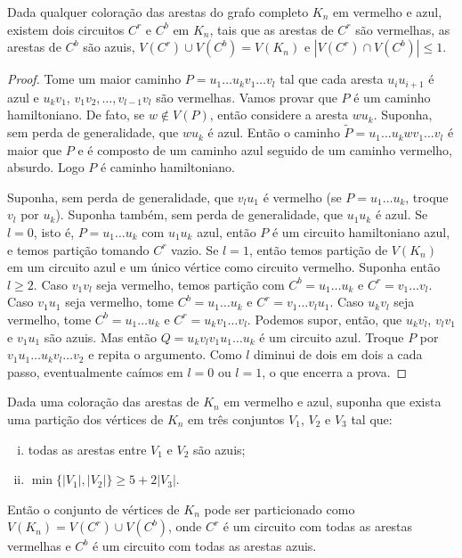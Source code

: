 \begin{lema}
	\label{lema:gyarfas}
	Dada qualquer coloração das arestas do grafo completo $K_n$ em vermelho e azul, existem dois circuitos $C^r$ e $C^b$ em $K_n$, tais que as arestas de $C^r$ são vermelhas, as arestas de $C^b$ são azuis, $V(C^r)\cup V(C^b) = V(K_n)$ e $|V(C^r)\cap V(C^b)|\leq1$.
\end{lema}

\begin{proof}
	Tome um maior caminho $P = u_1\dots u_kv_1\dots v_l$ tal que cada aresta $u_iu_{i+1}$ é azul e $u_kv_1$, $v_1v_2, \dots, v_{l-1}v_l$ são vermelhas. Vamos provar que $P$ é um caminho hamiltoniano. De fato, se $w\notin V(P)$, então considere a aresta $wu_k$. Suponha, sem perda de generalidade, que $wu_k$ é azul. Então o caminho $\tilde{P} = u_1\dots u_k w v_1\dots v_l$ é maior que $P$ e é composto de um caminho azul seguido de um caminho vermelho, absurdo. Logo $P$ é caminho hamiltoniano. 
	
	Suponha, sem perda de generalidade, que $v_lu_1$ é vermelho (se $P = u_1\dots u_k$, troque $v_l$ por $u_k$). Suponha também, sem perda de generalidade, que $u_1u_k$ é azul. Se $l=0$, isto é, $P=u_1\dots u_k$ com $u_1u_k$ azul, então $P$ é um circuito hamiltoniano azul, e temos partição tomando $C^r$ vazio. Se $l=1$, então temos partição de $V(K_n)$ em um circuito azul e um único vértice como circuito vermelho. Suponha então $l\geq2$. Caso $v_1v_l$ seja vermelho, temos partição com $C^b = u_1\dots u_k$ e $C^r = v_1\dots v_l$. Caso $v_1u_1$ seja vermelho, tome $C^b = u_1\dots u_k$ e $C^r = v_1\dots v_lu_1$. Caso $u_kv_l$ seja vermelho, tome $C^b = u_1\dots u_k$ e $C^r = u_kv_1\dots v_l$. Podemos supor, então, que $u_kv_l$, $v_lv_1$ e $v_1u_1$ são azuis. Mas então $Q = u_kv_lv_1u_1\dots u_k$ é um circuito azul. Troque $P$ por $v_1u_1\dots u_kv_l\dots v_2$ e repita o argumento. Como $l$ diminui de dois em dois a cada passo, eventualmente caímos em $l=0$ ou $l=1$, o que encerra a prova.
\end{proof}

\begin{lema}
	\label{lema:bipartido_azul}
	Dada uma coloração das arestas de $K_n$ em vermelho e azul, suponha que exista uma partição dos vértices de $K_n$ em três conjuntos $V_1$, $V_2$ e $V_3$ tal que:
	\begin{enumerate}[(i)]
		\item todas as arestas entre $V_1$ e $V_2$ são azuis;
		\item $\min\{|V_1|, |V_2|\}\geq 5 + 2|V_3|$.
	\end{enumerate}
	Então o conjunto de vértices de $K_n$ pode ser particionado como $V(K_n) = V(C^r)\cup V(C^b)$, onde $C^r$ é um circuito com todas as arestas vermelhas e $C^b$ é um circuito com todas as arestas azuis.
\end{lema}

